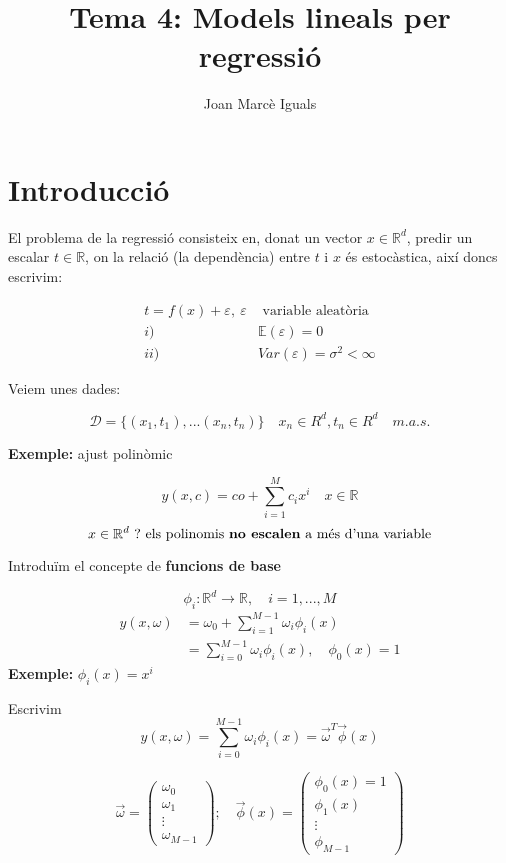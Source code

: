 \documentclass[a4paper]{article}
\title{Tema 4: Models lineals per regressió}
\author{Joan Marcè Iguals}
\begin{document}
\maketitle

\section{Introducció}
El problema de la regressió consisteix en, donat un vector $x \in \mathbb{R}^d$, predir un escalar $t \in \mathbb{R}$, on la relació (la dependència) entre $t$ i $x$ és estocàstica, així doncs escrivim:


\begin{align*}
t = f(x) + \varepsilon,\ \varepsilon &\text{ variable aleatòria} \\
i) \quad &\mathbb{E}(\varepsilon) = 0 \\
ii)\quad & Var(\varepsilon) = \sigma^2 < \infty
\end{align*}

Veiem unes dades:

$$
\mathcal{D} = \{ (x_1, t_1), ... (x_n, t_n)  \} \quad x_n \in R^d, t_n \in R^d \quad m.a.s.
$$

\textbf{Exemple:} ajust polinòmic

$$
y(x, c) = co + \sum_{i=1}^M c_i x^i \quad x \in \mathbb{R}
$$
$$
x \in \mathbb{R}^d\ ? \text{ els polinomis \textbf{no escalen} a més d'una variable}
$$

Introduïm el concepte de \textbf{funcions de base}

$$
\phi_i: \mathbb{R}^d \rightarrow \mathbb{R}, \quad i = 1,...,M
$$
\begin{align*}
y(x, \omega) &= \omega_0 + \sum_{i=1}^{M-1} \omega_i \phi_i (x) \\
&=  \sum_{i=0}^{M-1} \omega_i \phi_i (x), \quad \phi_0 (x) = 1
\end{align*}
\textbf{Exemple:} $\phi_i (x) = x^i$

Escrivim
$$
y(x, \omega) = \sum_{i=0}^{M-1} \omega_i \phi_i (x) = \vec{\omega}^T \vec{\phi} (x)
$$

$$
\vec{\omega} = 
\begin{pmatrix}
\omega_0 \\ \omega_1 \\ \vdots \\ \omega_{M-1}
\end{pmatrix};\quad
\vec{\phi}(x) = 
\begin{pmatrix}
\phi_0 (x) = 1 \\
\phi_1 (x) \\
\vdots \\
\phi_{M-1}
\end{pmatrix}
$$
\end{document}
